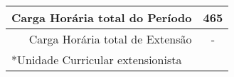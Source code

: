 \begin{tabular}{cccccccc}
\midrule
\multicolumn{7}{r}{Carga Horária total do Período}   & 465 \\ 
\midrule
\multicolumn{7}{r}{Carga Horária total de Extensão}  & -   \\
\bottomrule
\multicolumn{8}{l}{*Unidade Curricular extensionista}


\end{tabular}%
